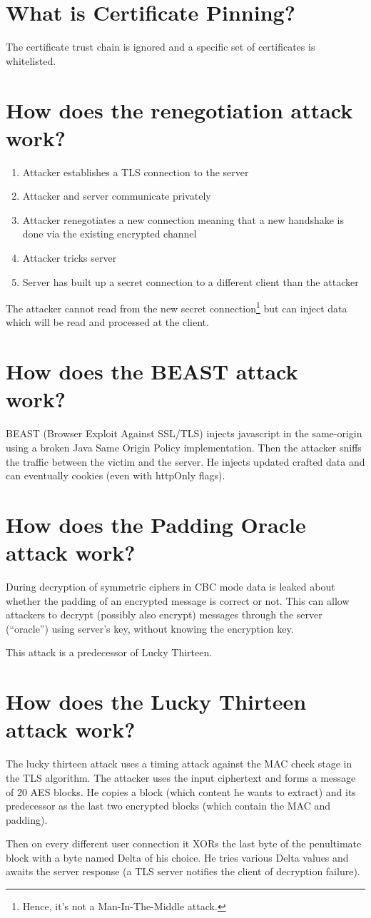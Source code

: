\documentclass[twocolumn]{article}
\newcommand{\question}[1]{\section{#1}}
\begin{document}
\question{What is Certificate Pinning?}
%
The certificate trust chain is ignored and a specific set of certificates is whitelisted.

\question{How does the renegotiation attack work?}
%
\begin{enumerate}
  \item Attacker establishes a TLS connection to the server
  \item Attacker and server communicate privately
  \item Attacker renegotiates a new connection meaning that a new handshake is done via the existing encrypted channel
  \item Attacker tricks server
  \item Server has built up a secret connection to a different client than the attacker
\end{enumerate}

The attacker cannot read from the new secret connection\footnote{Hence, it's not a Man-In-The-Middle attack.} but can inject data which will be read and processed at the client.

\question{How does the BEAST attack work?}
%
BEAST (Browser Exploit Against SSL/TLS) injects javascript in the same-origin using a broken Java Same Origin Policy implementation. Then the attacker sniffs the traffic between the victim and the server. He injects updated crafted data and can eventually cookies (even with httpOnly flags).

\question{How does the Padding Oracle attack work?}
%
During decryption of symmetric ciphers in CBC mode data is leaked about whether the padding of an encrypted message is correct or not. This can allow attackers to decrypt (possibly also encrypt) messages through the server (``oracle'') using server's key, without knowing the encryption key.

This attack is a predecessor of Lucky Thirteen.

\question{How does the Lucky Thirteen attack work?}
%
The lucky thirteen attack uses a timing attack against the MAC check stage in the TLS algorithm. The attacker uses the input ciphertext and forms a message of 20 AES blocks. He copies a block (which content he wants to extract) and its predecessor as the last two encrypted blocks (which contain the MAC and padding).

Then on every different user connection it XORs the last byte of the penultimate block with a byte named Delta of his choice. He tries various Delta values and awaits the server response (a TLS server notifies the client of decryption failure).
\end{document}
